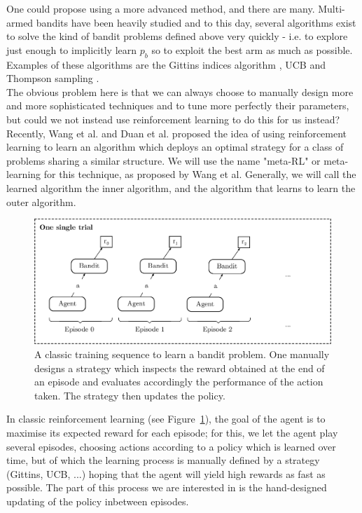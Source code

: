 One could propose using a more advanced method, and there are many. Multi-armed
bandits have been heavily studied and to this day, several algorithms exist to
solve the kind of bandit problems defined above very quickly - i.e. to explore
just enough to implicitly learn $p_b$ so to exploit the best arm as much as
possible. Examples of these algorithms are the Gittins indices algorithm
\cite{Gittins79banditprocesses},
UCB \cite{Auer:2002:FAM:599614.599677} and Thompson sampling
\cite{thompson1933}.\\

The obvious problem here is that we can always choose to manually design more
and more sophisticated techniques and to tune more perfectly their parameters,
but could we not instead use reinforcement learning to do this for us instead?\\

Recently, Wang et al. \cite{learningtorl} and Duan et al. \cite{fastrlviaslowrl}
proposed the idea of using reinforcement learning to learn an algorithm which
deploys an optimal strategy for a class of problems sharing a similar structure.
We will use the name "meta-RL" or meta-learning for this technique, as proposed 
by Wang et al. Generally, we will call the learned algorithm the inner
algorithm, and the algorithm that learns to learn the outer algorithm.\\

\begin{figure}
	\centering
	\includegraphics[width=0.7\linewidth]{fig/normal_bandit_training.eps}
	\caption{A classic training sequence to learn a bandit problem. One
	manually designs a strategy which inspects the reward obtained at 
	the end of an episode and evaluates accordingly the performance of the action
	taken. The strategy then updates the policy.}
	\label{fig:normal_bandit_training}
\end{figure}

In classic reinforcement learning (see Figure~\ref{fig:normal_bandit_training}),
the goal of the agent is to maximise its
expected reward for each episode; for this, we let the agent play several
episodes, choosing actions according to a policy which is learned over time, 
but of which the learning process is manually defined by a strategy (Gittins,
UCB, ...) hoping that the agent will yield high rewards as fast as possible.
The part of this process we are interested in is the hand-designed updating of
the policy inbetween episodes.\\

